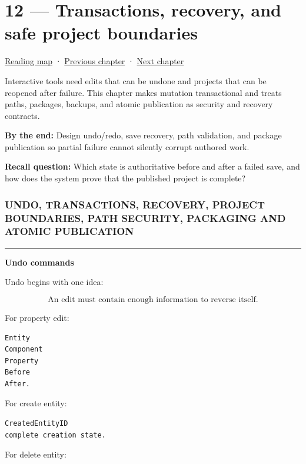 \hypertarget{05-engine-i-ch012}{}
\chapter{12 --- Transactions, recovery, and safe project boundaries}\label{05-engine-i-ch012-transactions-recovery-and-safe-project-boundaries}

\hyperref[volume-reading-map]{Reading map} · \hyperref[05-engine-i-ch011]{Previous chapter} · \hyperref[05-engine-i-ch013]{Next chapter}

Interactive tools need edits that can be undone and projects that can be reopened after failure. This chapter makes mutation transactional and treats paths, packages, backups, and atomic publication as security and recovery contracts.

\textbf{By the end:} Design undo/redo, save recovery, path validation, and package publication so partial failure cannot silently corrupt authored work.

\textbf{Recall question:} Which state is authoritative before and after a failed save, and how does the system prove that the published project is complete?

\subsection{UNDO, TRANSACTIONS, RECOVERY, PROJECT BOUNDARIES, PATH SECURITY, PACKAGING AND ATOMIC PUBLICATION}\label{05-engine-i-ch012-undo-transactions-recovery-project-boundaries-path-security-packaging-and-atomic-publication}

\begin{center}\rule{0.5\linewidth}{0.5pt}\end{center}

\textbf{Undo commands}

Undo begins with one idea:

\[
\boxed{
\text{An edit must contain enough information to reverse itself.}
}
\]

For property edit:

\begin{verbatim}
Entity
Component
Property
Before
After.
\end{verbatim}

For create entity:

\begin{verbatim}
CreatedEntityID
complete creation state.
\end{verbatim}

For delete entity:

